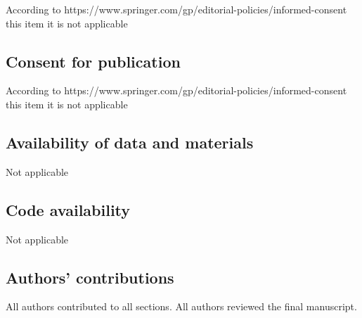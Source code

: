 	According to \newline
	https://www.springer.com/gp/editorial-policies/informed-consent this item it
	is not applicable
	
	\subsection{Consent for publication}
	
	According to \newline
	https://www.springer.com/gp/editorial-policies/informed-consent this item it
	is not applicable
	
	\subsection{Availability of data and materials}
	
	Not applicable
	
	\subsection{Code availability}
	
	Not applicable
	
	\subsection{Authors' contributions}
	
	All authors contributed to all sections. All authors reviewed the final manuscript.
	
